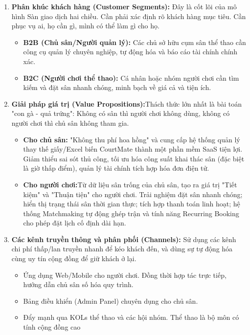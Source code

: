 \begin{enumerate}
    \item \textbf{Phân khúc khách hàng (Customer Segments):}
    Đây là cốt lõi của mô hình Sàn giao dịch hai chiều. Cần phải xác định rõ khách hàng mục tiêu. Cần phục vụ ai, họ cần gì, mình có thể làm gì cho họ.
    \begin{itemize}
        \item \textbf{B2B (Chủ sân/Người quản lý):} Các chủ sở hữu cụm sân thể thao cần công cụ quản lý chuyên nghiệp, tự động hóa và báo cáo tài chính chính xác.
        \item \textbf{B2C (Người chơi thể thao):} Cá nhân hoặc nhóm người chơi cần tìm kiếm và đặt sân nhanh chóng, minh bạch về giá cả và tiện ích.
    \end{itemize}

    \item \textbf{Giải pháp giá trị (Value Propositions):}Thách thức lớn nhất là bài toán "con gà - quả trứng": Không có sân thì người chơi không dùng, không có người chơi thì chủ sân không tham gia.
    \begin{itemize}
        \item \textbf{Cho chủ sân:} "Không thu phí hoa hồng" và cung cấp hệ thống quản lý thay thế giấy/Excel biến CourtMate thành một phần mềm SaaS tiện lợi. Giảm thiểu sai sót thủ công, tối ưu hóa công suất khai thác sân (đặc biệt là giờ thấp điểm), quản lý tài chính tích hợp hóa đơn điện tử.
        \item \textbf{Cho người chơi:}Từ dữ liệu sân trống của chủ sân,  tạo ra giá trị "Tiết kiệm" và "Thuận tiện" cho người chơi. Trải nghiệm đặt sân nhanh chóng; hiển thị trạng thái sân thời gian thực; tích hợp thanh toán linh hoạt; hệ thống Matchmaking tự động ghép trận và tính năng Recurring Booking cho phép đặt lịch cố định dài hạn.
    \end{itemize}

    \item \textbf{Các kênh truyền thông và phân phối (Channels):} Sử dụng các kênh chi phí thấp/lan truyền nhanh để kéo khách đến, và dùng sự tự động hóa cùng uy tín cộng đồng để giữ khách ở lại.
    \begin{itemize}
        \item Ứng dụng Web/Mobile cho người chơi. Đồng thời hợp tác trực tiếp, hướng dẫn chủ sân số hóa quy trình.
        \item Bảng điều khiển (Admin Panel) chuyên dụng cho chủ sân.
        \item Đẩy mạnh qua KOLs thể thao và các hội nhóm. Thể thao là bộ môn có tính cộng đồng cao
    \end{itemize}


\end{enumerate}
